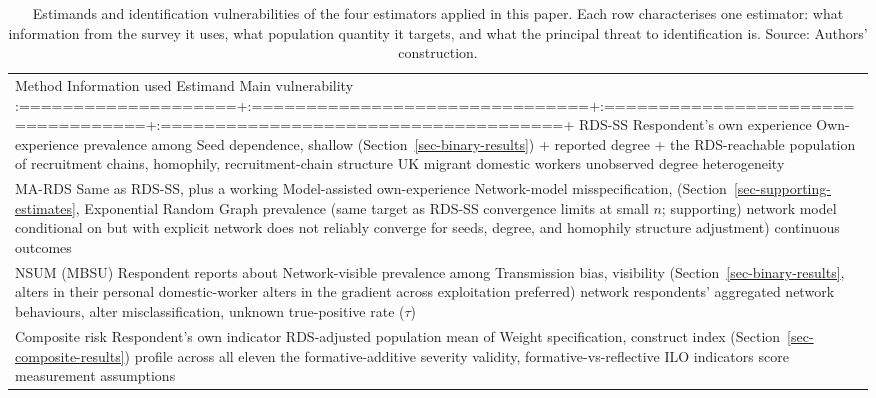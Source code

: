 \documentclass[
  12pt,
  letterpaper,
  DIV=11,
  numbers=noendperiod]{scrartcl}
\begin{document}
\begin{longtable}[]{@{}
  >{\raggedright\arraybackslash}p{}@{}}
\caption{Estimands and identification vulnerabilities of the four
estimators applied in this paper. Each row characterises one estimator:
what information from the survey it uses, what population quantity it
targets, and what the principal threat to identification is. Source:
Authors' construction.}\label{tbl-estimands}\tabularnewline
\toprule\noalign{}
\endfirsthead
\endhead
\bottomrule\noalign{}
\endlastfoot
Method \textbar{} Information used \textbar{} Estimand \textbar{} Main
vulnerability \textbar{}
:====================+:===============================+:===================================+:=====================================+
RDS-SS \textbar{} Respondent's own experience \textbar{} Own-experience
prevalence among \textbar{} Seed dependence, shallow \textbar{}
(Section~\ref{sec-binary-results}) \textbar{} + reported degree +
\textbar{} the RDS-reachable population of \textbar{} recruitment
chains, homophily, \textbar{} \textbar{} recruitment-chain structure
\textbar{} UK migrant domestic workers \textbar{} unobserved degree
heterogeneity \textbar{} \\
MA-RDS \textbar{} Same as RDS-SS, plus a working \textbar{}
Model-assisted own-experience \textbar{} Network-model misspecification,
\textbar{} (Section~\ref{sec-supporting-estimates}, \textbar{}
Exponential Random Graph \textbar{} prevalence (same target as RDS-SS
\textbar{} convergence limits at small \(n\); supporting) \textbar{}
network model conditional on \textbar{} but with explicit network
\textbar{} does not reliably converge for \textbar{} \textbar{} seeds,
degree, and homophily \textbar{} structure adjustment) \textbar{}
continuous outcomes \textbar{} \\
NSUM (MBSU) \textbar{} Respondent reports about \textbar{}
Network-visible prevalence among \textbar{} Transmission bias,
visibility \textbar{} (Section~\ref{sec-binary-results}, \textbar{}
alters in their personal \textbar{} domestic-worker alters in the
\textbar{} gradient across exploitation \textbar{} preferred) \textbar{}
network \textbar{} respondents' aggregated network \textbar{}
behaviours, alter misclassification, \textbar{} \textbar{} \textbar{}
\textbar{} unknown true-positive rate (\(\tau\)) \textbar{} \\
Composite risk \textbar{} Respondent's own indicator \textbar{}
RDS-adjusted population mean of \textbar{} Weight specification,
construct \textbar{} index (Section~\ref{sec-composite-results})
\textbar{} profile across all eleven \textbar{} the formative-additive
severity \textbar{} validity, formative-vs-reflective \textbar{}
\textbar{} ILO indicators \textbar{} score \textbar{} measurement
assumptions \textbar{} \\
\end{longtable}
\end{document}
